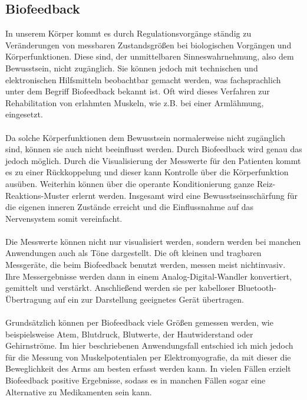 \subsection{Biofeedback}
In unserem Körper kommt es durch Regulationsvorgänge ständig zu Veränderungen von messbaren Zustandsgrößen bei biologischen Vorgängen und Körperfunktionen. Diese sind, der unmittelbaren Sinneswahrnehmung, also dem Bewusstsein, nicht zugänglich. Sie können jedoch mit technischen und elektronischen Hilfsmitteln beobachtbar gemacht werden, was fachsprachlich unter dem Begriff Biofeedback bekannt ist. \cite{Src:BiofeedWiki} Oft wird dieses Verfahren zur Rehabilitation von erlahmten Muskeln, wie z.B. bei einer Armlähmung, eingesetzt. \\ \\
Da solche Körperfunktionen dem Bewusstsein normalerweise nicht zugänglich sind, können sie auch nicht beeinflusst werden. Durch Biofeedback wird genau das jedoch möglich. Durch die Visualisierung der Messwerte für den Patienten kommt es zu einer Rückkoppelung und dieser kann Kontrolle über die Körperfunktion ausüben. Weiterhin können über die operante Konditionierung ganze Reiz-Reaktions-Muster erlernt werden. Insgesamt wird eine Bewusstseinsschärfung für die eigenen inneren Zustände erreicht und die Einflussnahme auf das Nervensystem somit vereinfacht. \cite{Src:BiofeedWiki} \\ \\
Die Messwerte können nicht nur visualisiert werden, sondern werden bei manchen Anwendungen auch als Töne dargestellt. Die oft kleinen und tragbaren Messgeräte, die beim Biofeedback benutzt werden, messen meist nichtinvasiv. \cite{Src:BiofeedWiki} Ihre Messergebnisse werden dann in einem Analog-Digital-Wandler konvertiert, gemittelt und verstärkt. Anschließend werden sie per kabelloser Bluetooth-Übertragung auf ein zur Darstellung geeignetes Gerät übertragen. \\ \\
Grundsätzlich können per Biofeedback viele Größen gemessen werden, wie beispielsweise Atem, Blutdruck, Blutwerte, der Hautwiderstand oder Gehirnströme. Im hier beschriebenen Anwendungsfall entschied ich mich jedoch für die Messung von Muskelpotentialen per Elektromyografie, da mit dieser die Beweglichkeit des Arms am besten erfasst werden kann. In vielen Fällen erzielt Biofeedback positive Ergebnisse, sodass es in manchen Fällen sogar eine Alternative zu Medikamenten sein kann. \cite{Src:BiofeedWiki}